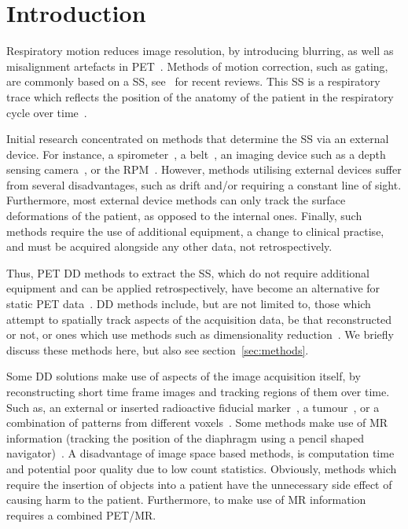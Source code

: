 \section{Introduction} \label{sec:introduction}
    Respiratory motion reduces image resolution, by introducing blurring, as well as misalignment artefacts in \gls{PET}~\parencite{Nehmeh2008a}. Methods of motion correction, such as gating, are commonly based on a \gls{SS}, see~\parencite{Lamare2022PETVadis, Kyme2021MotionCT} for recent reviews. This \gls{SS} is a respiratory trace which reflects the position of the anatomy of the patient in the respiratory cycle over time~\parencite{Kesner2010AMethods, Kesner2013GatingPET}.
    
    Initial research concentrated on methods that determine the \gls{SS} via an external device. For instance, a spirometer~\parencite{Voscopoulos2013EvaluationScenarios}, a belt~\parencite{Yu2016}, an imaging device such as a depth sensing camera~\parencite{Silverstein2018ComparativeSensor, Xia2012AConcept}, or the \gls{RPM}~\parencite{Bettinardi2013Motion-trackingPET/CT}. However, methods utilising external devices suffer from several disadvantages, such as drift and/or requiring a constant line of sight. Furthermore, most external device methods can only track the surface deformations of the patient, as opposed to the internal ones. Finally, such methods require the use of additional equipment, a change to clinical practise, and must be acquired alongside any other data, not retrospectively.
    
    Thus, \gls{PET} \gls{DD} methods to extract the \gls{SS}, which do not require additional equipment and can be applied retrospectively, have become an alternative for static \gls{PET} data~\parencite{Kesner2014OnFramework}. \gls{DD} methods include, but are not limited to, those which attempt to spatially track aspects of the acquisition data, be that reconstructed or not, or ones which use methods such as dimensionality reduction~\parencite{Lamare2022PETVadis}. We briefly discuss these methods here, but also see section~\ref{sec:methods}.
    
    Some \gls{DD} solutions make use of aspects of the image acquisition itself, by reconstructing short time frame images and tracking regions of them over time. Such as, an external or inserted radioactive fiducial marker~\parencite{Buther2013ExternalTomography., Zimmermann2003UseMRI}, a tumour~\parencite{Bundschuh2007}, or a combination of patterns from different voxels~\parencite{Kesner2009RespiratoryData}. Some methods make use of \gls{MR} information (tracking the position of the diaphragm using a pencil shaped navigator)~\parencite{Taylor1997MRAngiography, Furst2015MotionPET/MR}. A disadvantage of image space based methods, is computation time and potential poor quality due to low count statistics. Obviously, methods which require the insertion of objects into a patient have the unnecessary side effect of causing harm to the patient. Furthermore, to make use of \gls{MR} information requires a combined \gls{PET}/\gls{MR}.
    
